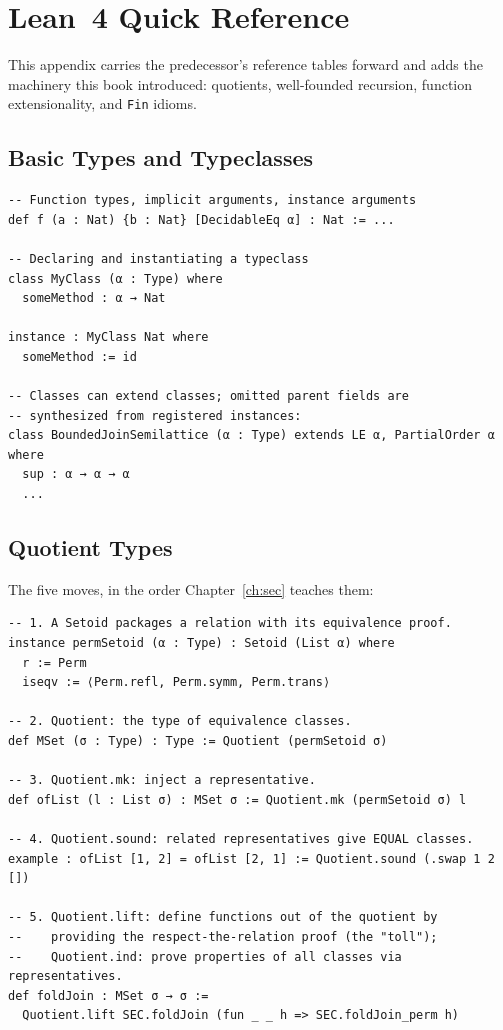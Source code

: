 \documentclass[12pt, a4paper, openright]{book}
\theoremstyle{thmstyle}
\theoremstyle{defstyle}
\newcommand{\lc}[1]{\texttt{#1}}
\begin{document}
\chapter{Lean~4 Quick Reference}
\label{app:quickref}

This appendix carries the predecessor's reference tables forward and
adds the machinery this book introduced: quotients, well-founded
recursion, function extensionality, and \lc{Fin} idioms.

\section{Basic Types and Typeclasses}

\begin{verbatim}
-- Function types, implicit arguments, instance arguments
def f (a : Nat) {b : Nat} [DecidableEq α] : Nat := ...

-- Declaring and instantiating a typeclass
class MyClass (α : Type) where
  someMethod : α → Nat

instance : MyClass Nat where
  someMethod := id

-- Classes can extend classes; omitted parent fields are
-- synthesized from registered instances:
class BoundedJoinSemilattice (α : Type) extends LE α, PartialOrder α where
  sup : α → α → α
  ...
\end{verbatim}

\section{Quotient Types}

The five moves, in the order Chapter~\ref{ch:sec} teaches them:

\begin{verbatim}
-- 1. A Setoid packages a relation with its equivalence proof.
instance permSetoid (α : Type) : Setoid (List α) where
  r := Perm
  iseqv := ⟨Perm.refl, Perm.symm, Perm.trans⟩

-- 2. Quotient: the type of equivalence classes.
def MSet (σ : Type) : Type := Quotient (permSetoid σ)

-- 3. Quotient.mk: inject a representative.
def ofList (l : List σ) : MSet σ := Quotient.mk (permSetoid σ) l

-- 4. Quotient.sound: related representatives give EQUAL classes.
example : ofList [1, 2] = ofList [2, 1] := Quotient.sound (.swap 1 2 [])

-- 5. Quotient.lift: define functions out of the quotient by
--    providing the respect-the-relation proof (the "toll");
--    Quotient.ind: prove properties of all classes via representatives.
def foldJoin : MSet σ → σ :=
  Quotient.lift SEC.foldJoin (fun _ _ h => SEC.foldJoin_perm h)
\end{verbatim}
\end{document}
